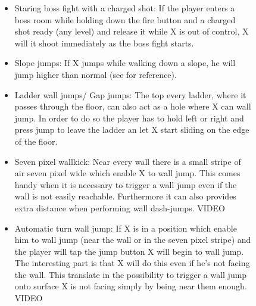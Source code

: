 \begin{figure}[htp]
\begin{itemize}
	\item Staring boss fight with a charged shot: If the player enters a boss room while holding down the fire button and a charged shot ready (any level) and release it while X is out of control, X will it shoot immediately as the boss fight starts.
	
	\item Slope jumps: If X jumps while walking down a slope, he will jump higher than normal (see  for reference).
	
	\item Ladder wall jumps/ Gap jumps: The top every ladder, where it passes through the floor, can also act as a hole where X can wall jump. In order to do so the player has to hold left or right and press jump to leave the ladder an let X start sliding on the edge of the floor. %
	\item Seven pixel wallkick\cite{MMX_RTA_wiki:basics}: Near every wall there is a small stripe of air seven pixel wide which enable X to wall jump. This comes handy when it is necessary to trigger a wall jump even if the wall is not easily reachable. Furthermore it can also provides extra distance when performing wall dash-jumps. VIDEO
	
	\item Automatic turn wall jump: If X is in a position which enable him to wall jump (near the wall or in the seven pixel stripe) and the player will tap the jump button X will begin to wall jump. The interesting part is that X will do this even if he's not facing the wall. This translate in the possibility to trigger a wall jump onto surface X is not facing simply by being near them enough. VIDEO
\end{itemize}


\end{figure}
